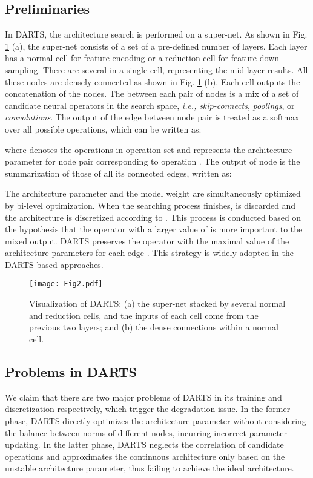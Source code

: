\documentclass[journal]{IEEEtran}
\begin{document}
\subsection{Preliminaries}
In DARTS, the architecture search is performed on a super-net. As shown in Fig.  \ref{fig:darts} (a), the super-net consists of a set of a pre-defined number of layers. Each layer has a normal cell for feature encoding or a reduction cell for feature down-sampling. There are several  in a single cell, representing the mid-layer results. All these nodes are densely connected as shown in Fig. \ref{fig:darts} (b). Each cell outputs the concatenation of the nodes. The  between each pair of nodes is a mix of a set of candidate neural operators in the search space, \emph {i.e.,} \textit{skip-connects}, \textit{poolings}, or \textit{convolutions}. The output of the edge between node pair  is treated as a softmax over all possible operations, which can be written as:


where  denotes the operations in operation set  and  represents the architecture parameter for node pair  corresponding to operation . The output of node  is the summarization of those of all its connected edges, written as:



The architecture parameter  and the model weight  are simultaneously optimized by bi-level optimization. When the searching process finishes,  is discarded and the architecture is discretized according to . This process is conducted based on the hypothesis that the operator with a larger value of  is more important to the mixed output. DARTS preserves the operator with the maximal value of the architecture parameters for each edge . This strategy is widely adopted in the DARTS-based approaches.

\begin{figure}[!htb]
\begin{center}
\end{center}
	\texttt{[image: Fig2.pdf]}
   \caption{Visualization of DARTS: (a) the super-net stacked by several normal and reduction cells, and the inputs of each cell come from the previous two layers; and (b) the dense connections within a normal cell.}
\label{fig:darts}
\end{figure} 

\subsection{Problems in DARTS}
We claim that there are two major problems of DARTS in its training and discretization respectively, which trigger the degradation issue. In the former phase, DARTS directly optimizes the architecture parameter without considering the balance between norms of different nodes, incurring incorrect parameter updating. In the latter phase, DARTS neglects the correlation of candidate operations and  approximates the continuous architecture only based on the unstable architecture parameter, thus failing to achieve the ideal architecture.
\end{document}

